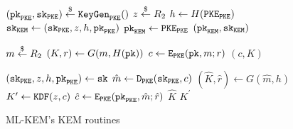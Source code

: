 \documentclass{article}
\begin{document}
\begin{figure}[H]
    \begin{minipage}{0.3\textwidth}
        \begin{algorithm}[H]
            \caption{$\keygen_\monospace{ML-KEM}$}\label{alg:mlkem-keygen}
            \begin{algorithmic}[1]
                \State $(\texttt{pk}_\texttt{PKE}, \texttt{sk}_\texttt{PKE}) \stackrel{\$}{\leftarrow} \texttt{KeyGen}_\texttt{PKE}()$
                \State $z \stackrel{\$}{\leftarrow} R_2$
                \State $h \leftarrow H(\texttt{PKE}_\texttt{PKE})$
                \State $\texttt{sk}_\texttt{KEM} \leftarrow (\texttt{sk}_\texttt{PKE}, z, h, \texttt{pk}_\texttt{PKE})$
                \State $\texttt{pk}_\texttt{KEM} \leftarrow \texttt{PKE}_\texttt{PKE}$
                \State \Return $(\texttt{pk}_\texttt{KEM}, \texttt{sk}_\texttt{KEM})$
            \end{algorithmic}
        \end{algorithm}
    \end{minipage}
    \hfill
    \begin{minipage}{0.33\textwidth}
        \begin{algorithm}[H]
            \caption{$\encap_\monospace{ML-KEM}(\pk_\kem)$}\label{alg:mlkem-encap}
            \begin{algorithmic}[1]
                \State $m \stackrel{\$}{\leftarrow} R_2$
                \State $(K, r) \leftarrow G(m, H(\texttt{pk}))$
                \State $c \leftarrow \texttt{E}_\texttt{PKE}(\texttt{pk}, m; r)$
                \State \Return $(c, K)$
            \end{algorithmic}
        \end{algorithm}
    \end{minipage}
    \hfill
    \begin{minipage}{0.33\textwidth}
        \begin{algorithm}[H]
            \caption{$\decap_\monospace{ML-KEM}(\sk, c)$}\label{alg:mlkem-decap}
            \begin{algorithmic}[1]
                \State $(\texttt{sk}_\texttt{PKE}, z, h, \texttt{pk}_\texttt{PKE}) \leftarrow \texttt{sk}$
                \State $\hat{m} \leftarrow \texttt{D}_\texttt{PKE}(\texttt{sk}_\texttt{PKE}, c)$
                \State $(\hat{K}, \hat{r}) \leftarrow G(\hat{m}, h)$
                \State $K^\prime \leftarrow \texttt{KDF}(z, c)$
                \State $\hat{c} \leftarrow \texttt{E}_\texttt{PKE}(\texttt{pk}_\texttt{PKE}, \hat{m}; \hat{r})$
                    \State \Return $\hat{K}$
                \Else
                    \State \Return $K^\prime$
                \EndIf
            \end{algorithmic}
        \end{algorithm}
    \end{minipage}
    \caption{ML-KEM's KEM routines}\label{fig:mlkem-kem-routines}
\end{figure}



\end{document}
